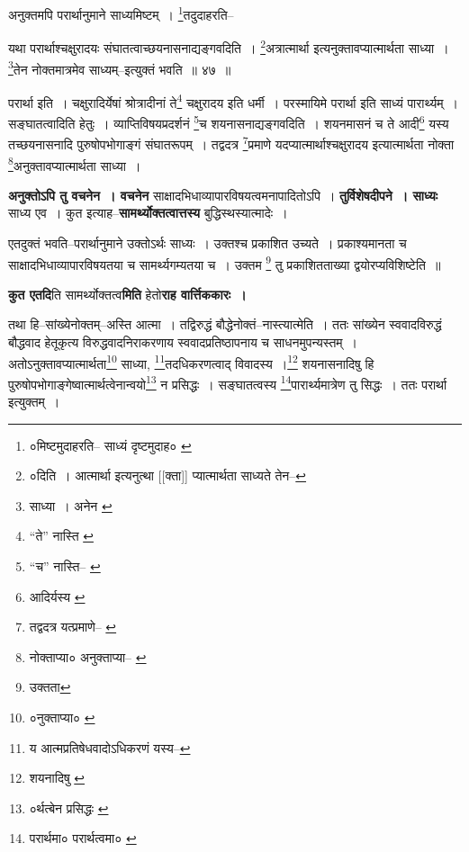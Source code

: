 \documentclass[article,12pt,a4paper]{memoir}
\begin{document}
	  \pstart अनुक्तमपि परार्थानुमाने साध्यमिष्टम् । \footnote{०मिष्टमुदाहरति--\cite{dp-msB} साध्यं दृष्टमुदाह० \cite{dp-msC} \cite{dp-msD}}तदुदाहरति--
	\pend
       
	  \bigskip
	  \begingroup
	

	  \pstart यथा परार्थाश्चक्षुरादयः संघातत्वाच्छयनासनाद्यङ्गवदिति । \footnote{०दिति । आत्मार्था इत्यनुत्था [[क्ता]] प्यात्मार्थता साध्यते तेन--\cite{dp-msC}}अत्रात्मार्था इत्यनुक्तावप्यात्मार्थता साध्या । \footnote{साध्या । अनेन \cite{dp-msB} \cite{dp-edP} \cite{dp-edH} \cite{dp-edE}}तेन नोक्तमात्रमेव साध्यम्--इत्युक्तं भवति ॥ ४७ ॥
	\pend
      
	  \endgroup
	 

	  \pstart परार्था इति । चक्षुरादिर्येषां श्रोत्रादीनां ते\footnote{“ते” नास्ति \cite{dp-msB}} चक्षुरादय इति धर्मी । परस्मायिमे परार्था इति साध्यं पारार्थ्यम् । सङ्घातत्वादिति हेतुः । व्याप्तिविषयप्रदर्शनं \footnote{“च” नास्ति--\cite{dp-msA} \cite{dp-msB} \cite{dp-msD} \cite{dp-edP} \cite{dp-edH} \cite{dp-edE} \cite{dp-edN}}च शयनासनाद्यङ्गवदिति । शयनमासनं च ते आदी\footnote{आदिर्यस्य \cite{dp-msD}} यस्य तच्छयनासनादि पुरुषोपभोगाङ्गं संघातरूपम् । तद्वदत्र \footnote{तद्वदत्र यत्प्रमाणे--\cite{dp-msA} \cite{dp-msB} \cite{dp-edP} \cite{dp-edH}}प्रमाणे यदप्यात्मार्थाश्चक्षुरादय इत्यात्मार्थता नोक्ता \footnote{नोक्ताप्या० \cite{dp-msB} अनुक्ताप्या--\cite{dp-msA} \cite{dp-msC} \cite{dp-msD} \cite{dp-edP} \cite{dp-edH} \cite{dp-edE} \cite{dp-edN}}अनुक्तावप्यात्मार्थता साध्या ।
	\pend
      
	  \endgroup
	

	  \pstart \textbf{अनुक्तोऽपि तु वचनेन । वचनेन} साक्षादभिधाव्यापारविषयत्वमनापादितोऽपि । \textbf{तुर्विशेषदीपने । साध्यः} साध्य एव । कुत इत्याह--\textbf{सामर्थ्योक्तत्वात्तस्य} बुद्धिस्थस्यात्मादेः ।
	\pend
      

	  \pstart एतदुक्तं भवति--परार्थानुमाने उक्तोऽर्थः साध्यः । उक्तश्च प्रकाशित उच्यते । प्रकाश्यमानता च साक्षादभिधाव्यापारविषयतया च सामर्थ्यगम्यतया च । उक्तम \footnote{उक्तता} तु प्रकाशितताख्या द्वयोरप्यविशिष्टेति ॥
	\pend
      

	  \pstart \textbf{कुत एतदि}ति सामर्थ्योक्तत्व\textbf{मिति} हेतो\textbf{राह वार्त्तिककारः ।}
	\pend
      \leavevmode{}
	  \bigskip
	  \begingroup
	

	  \pstart तथा हि--सांख्येनोक्तम्--अस्ति आत्मा । तद्विरुद्धं बौद्धेनोक्तं--नास्त्यात्मेति । ततः सांख्येन स्ववादविरुद्धं बौद्धवाद हेतूकृत्य विरुद्धवादनिराकरणाय स्ववादप्रतिष्ठापनाय च साधनमुपन्यस्तम् । अतोऽनुक्तावप्यात्मार्थता\footnote{०नुक्ताप्या० \cite{dp-msA} \cite{dp-msB} \cite{dp-msC} \cite{dp-msD} \cite{dp-edP} \cite{dp-edH} \cite{dp-edE} \cite{dp-edN}} साध्या, \footnote{य आत्मप्रतिषेधवादोऽधिकरणं यस्य--\cite{dp-msD-n}}तदधिकरणत्वाद् विवादस्य ।\footnote{शयनादिषु \cite{dp-msA}} शयनासनादिषु हि पुरुषोपभोगाङ्गेष्वात्मार्थत्वेनान्वयो\footnote{०र्थत्बेन प्रसिद्धः \cite{dp-msA}} न प्रसिद्धः । सङ्घातत्वस्य \footnote{परार्थमा० \cite{dp-msA} \cite{dp-msB} \cite{dp-edP} \cite{dp-edH} परार्थत्वमा० \cite{dp-edN}}पारार्थ्यमात्रेण तु सिद्धः । ततः परार्था इत्युक्तम् ।
	\pend
       
\end{document}
